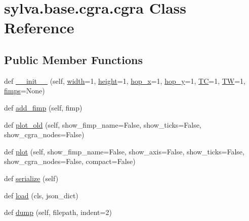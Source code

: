 \hypertarget{classsylva_1_1base_1_1cgra_1_1cgra}{}\section{sylva.\+base.\+cgra.\+cgra Class Reference}
\label{classsylva_1_1base_1_1cgra_1_1cgra}
\subsection*{Public Member Functions}
\begin{DoxyCompactItemize}
\item 
def \hyperlink{classsylva_1_1base_1_1cgra_1_1cgra_a8eb2125d36590b1d58bb4890bda88f6e}{\+\_\+\+\_\+init\+\_\+\+\_\+} (self, \hyperlink{classsylva_1_1base_1_1cgra_1_1cgra_a9efe9218f0c8eb76d2afa0337af1c0f2}{width}=1, \hyperlink{classsylva_1_1base_1_1cgra_1_1cgra_a1b1902a730c5ff918da267f662c39ece}{height}=1, \hyperlink{classsylva_1_1base_1_1cgra_1_1cgra_aadc7f8128f82f0ee772bf35b2169597e}{hop\+\_\+x}=1, \hyperlink{classsylva_1_1base_1_1cgra_1_1cgra_aaaed8b52a3aa573699d89fcee405b098}{hop\+\_\+y}=1, \hyperlink{classsylva_1_1base_1_1cgra_1_1cgra_a06d7bc08e37fe58d200134da5ecb7336}{TC}=1, \hyperlink{classsylva_1_1base_1_1cgra_1_1cgra_a5e0af81085855ab41e2131de593af9da}{TW}=1, \hyperlink{classsylva_1_1base_1_1cgra_1_1cgra_ad4e2965612f63dfd12593a5fe3ace3ac}{fimps}=None)
\item 
def \hyperlink{classsylva_1_1base_1_1cgra_1_1cgra_a8bb04d75e7980772981822aab2966637}{add\+\_\+fimp} (self, fimp)
\item 
def \hyperlink{classsylva_1_1base_1_1cgra_1_1cgra_ade9b60b151d4852774aab73cb01475e2}{plot\+\_\+old} (self, show\+\_\+fimp\+\_\+name=False, show\+\_\+ticks=False, show\+\_\+cgra\+\_\+nodes=False)
\item 
def \hyperlink{classsylva_1_1base_1_1cgra_1_1cgra_a62e35aca9fe9951450c7c9619bc49725}{plot} (self, show\+\_\+fimp\+\_\+name=False, show\+\_\+axis=False, show\+\_\+ticks=False, show\+\_\+cgra\+\_\+nodes=False, compact=False)
\item 
def \hyperlink{classsylva_1_1base_1_1cgra_1_1cgra_a66c18e2d096e32c652a1e95d204bdf4a}{serialize} (self)
\item 
def \hyperlink{classsylva_1_1base_1_1cgra_1_1cgra_a8a23d70c524344ab7046469b6f47ff1a}{load} (cls, json\+\_\+dict)
\item 
def \hyperlink{classsylva_1_1base_1_1cgra_1_1cgra_a98e40701c2779ebe63f1669a4e68ed80}{dump} (self, filepath, indent=2)
\end{DoxyCompactItemize}
